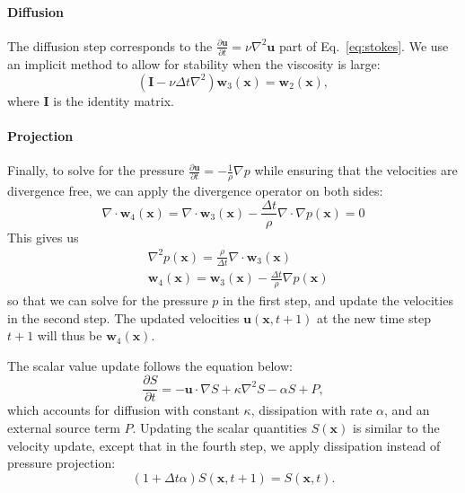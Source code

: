 \documentclass[sigconf]{acmart}
\begin{document}
\paragraph{Diffusion} The diffusion step corresponds to the $\frac{\partial \mathbf{u}}{\partial t} = \nu\nabla^2\mathbf{u}$ part of Eq.~\ref{eq:stokes}. We use an implicit method to allow for stability when the viscosity is large:
\begin{equation}
  (\mathbf{I} - \nu\Delta t\nabla^2)\mathbf{w}_3(\mathbf{x}) = \mathbf{w}_2(\mathbf{x}),
\end{equation}
where $\mathbf{I}$ is the identity matrix.

\paragraph{Projection} Finally, to solve for the pressure $\frac{\partial \mathbf{u}}{\partial t} = -\frac{1}{\rho}\nabla p$ while ensuring that the velocities are divergence free, we can apply the divergence operator on both sides:
\begin{equation}
  \nabla\cdot\mathbf{w}_4(\mathbf{x}) = \nabla\cdot\mathbf{w}_3(\mathbf{x}) - \frac{\Delta t}{\rho}\nabla\cdot\nabla p(\mathbf{x}) = 0
\end{equation}
This gives us
\begin{equation}
\begin{split}
  &\nabla^2 p(\mathbf{x}) = \frac{\rho}{\Delta t}\nabla\cdot\mathbf{w}_3(\mathbf{x})\\
  &\mathbf{w}_4(\mathbf{x}) = \mathbf{w}_3(\mathbf{x}) - \frac{\Delta t}{\rho}\nabla p(\mathbf{x})
\end{split}
\end{equation}
so that we can solve for the pressure $p$ in the first step, and update the velocities in the second step. The updated velocities $\mathbf{u}(\mathbf{x}, t + 1)$ at the new time step $t + 1$ will thus be $\mathbf{w}_4(\mathbf{x})$.

The scalar value update follows the equation below:
\begin{equation}
  \frac{\partial S}{\partial t} = -\mathbf{u}\cdot\nabla S + \kappa\nabla^2 S - \alpha S + P,
\end{equation}
which accounts for diffusion with constant $\kappa$, dissipation with rate $\alpha$, and an external source term $P$.
Updating the scalar quantities $S(\mathbf{x})$ is similar to the velocity update, except that in the fourth step, we apply dissipation instead of pressure projection:
\begin{equation}
  (1 + \Delta t \alpha)S(\mathbf{x}, t + 1) = S(\mathbf{x}, t).
\end{equation}
\end{document}
